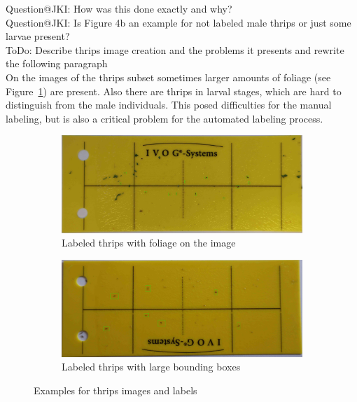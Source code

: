 \documentclass[12pt,a4paper]{article}
\begin{document}
{\color{red} Question@JKI: How was this done exactly and why?}\\
{\color{red} Question@JKI: Is Figure 4b an example for not labeled male thrips or just some larvae present?}\\
{\color{red} ToDo: Describe thrips image creation and the problems it presents and rewrite the following paragraph}\\
On the images of the thrips subset sometimes larger amounts of foliage (see Figure~\ref{fig:folliage}) are present. Also there are thrips in larval stages, which are hard to distinguish from the male individuals. This posed difficulties for the manual labeling, but is also a critical problem for the automated labeling process.

\begin{figure}[H]
    \centering
    \begin{subfigure}{0.45\textwidth}
        \centering
        \includegraphics[width=\linewidth]{images/figure_folliage_FRANOC_0046_with_boxes.jpg}
        \caption{Labeled thrips with foliage on the image}
        \label{fig:folliage}
    \end{subfigure}
    \hfill
    \begin{subfigure}{0.45\textwidth}
        \centering
        \includegraphics[width=\linewidth]{images/figure_large_boxes_FRANOC_0675_with_boxes.jpg}
        \caption{Labeled thrips with large bounding boxes}
        \label{fig:large_boxes}
    \end{subfigure}
    
    \caption{Examples for thrips images and labels}
    \label{fig:thrips_YSTs}
\end{figure}
\end{document}

